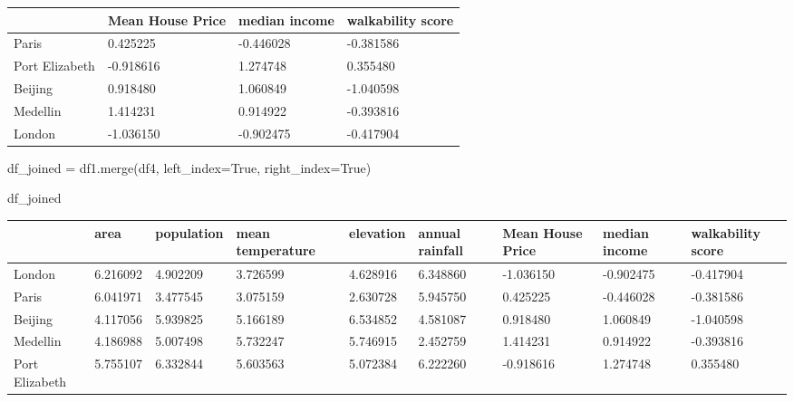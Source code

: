 \documentclass[
  letterpaper,
  DIV=11,
  numbers=noendperiod]{scrreprt}
\newenvironment{Shaded}{\begin{snugshade}}{\end{snugshade}}
\newcommand{\NormalTok}[1]{\textcolor[rgb]{0.00,0.23,0.31}{#1}}
\newcommand{\OperatorTok}[1]{\textcolor[rgb]{0.37,0.37,0.37}{#1}}
\newcommand{\VariableTok}[1]{\textcolor[rgb]{0.07,0.07,0.07}{#1}}
\begin{document}
\begin{longtable}[]{@{}llll@{}}
\toprule\noalign{}
& Mean House Price & median income & walkability score \\
\midrule\noalign{}
\endhead
\bottomrule\noalign{}
\endlastfoot
Paris & 0.425225 & -0.446028 & -0.381586 \\
Port Elizabeth & -0.918616 & 1.274748 & 0.355480 \\
Beijing & 0.918480 & 1.060849 & -1.040598 \\
Medellin & 1.414231 & 0.914922 & -0.393816 \\
London & -1.036150 & -0.902475 & -0.417904 \\
\end{longtable}

\begin{Shaded}
\begin{Highlighting}[]
\NormalTok{df\_joined }\OperatorTok{=}\NormalTok{ df1.merge(df4, left\_index}\OperatorTok{=}\VariableTok{True}\NormalTok{, right\_index}\OperatorTok{=}\VariableTok{True}\NormalTok{)}
\end{Highlighting}
\end{Shaded}

\begin{Shaded}
\begin{Highlighting}[]
\NormalTok{df\_joined}
\end{Highlighting}
\end{Shaded}

\begin{longtable}[]{@{}lllllllll@{}}
\toprule\noalign{}
& area & population & mean temperature & elevation & annual rainfall &
Mean House Price & median income & walkability score \\
\midrule\noalign{}
\endhead
\bottomrule\noalign{}
\endlastfoot
London & 6.216092 & 4.902209 & 3.726599 & 4.628916 & 6.348860 &
-1.036150 & -0.902475 & -0.417904 \\
Paris & 6.041971 & 3.477545 & 3.075159 & 2.630728 & 5.945750 & 0.425225
& -0.446028 & -0.381586 \\
Beijing & 4.117056 & 5.939825 & 5.166189 & 6.534852 & 4.581087 &
0.918480 & 1.060849 & -1.040598 \\
Medellin & 4.186988 & 5.007498 & 5.732247 & 5.746915 & 2.452759 &
1.414231 & 0.914922 & -0.393816 \\
Port Elizabeth & 5.755107 & 6.332844 & 5.603563 & 5.072384 & 6.222260 &
-0.918616 & 1.274748 & 0.355480 \\
\end{longtable}
\end{document}
